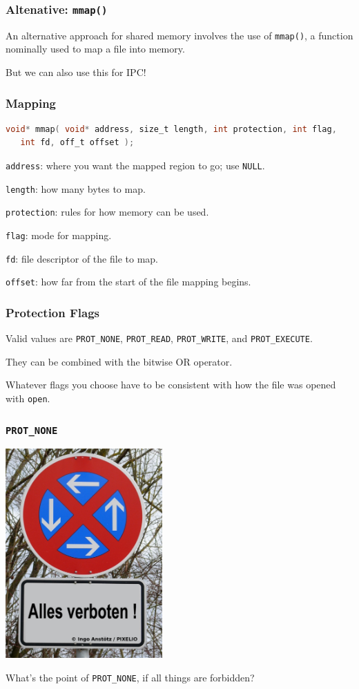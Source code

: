 \begin{frame}
\frametitle{Altenative: \texttt{mmap()}}

 An alternative approach for shared memory involves the use of \texttt{mmap()}, a function nominally used to map a file into memory. 

But we can also use this for IPC!

\end{frame}


\begin{frame}[fragile]
\frametitle{Mapping}
\begin{lstlisting}[language=C]
void* mmap( void* address, size_t length, int protection, int flag,
   int fd, off_t offset );
\end{lstlisting}

\texttt{address}: where you want the mapped region to go; use \texttt{NULL}.

\texttt{length}: how many bytes to map.

\texttt{protection}: rules for how memory can be used.

\texttt{flag}: mode for mapping.

\texttt{fd}: file descriptor of the file to map.

\texttt{offset}: how far from the start of the file mapping begins.

\end{frame}


\begin{frame}
\frametitle{Protection Flags}

Valid values are \texttt{PROT\_NONE}, \texttt{PROT\_READ}, \texttt{PROT\_WRITE}, and \texttt{PROT\_EXECUTE}.

They can be combined with the bitwise OR operator.

Whatever flags you choose have to be consistent with how the file was opened with \texttt{open}.

\end{frame}


\begin{frame}
\frametitle{\texttt{PROT\_NONE}}

\begin{center}
	\includegraphics[width=0.45\textwidth]{images/AllesVerboten.jpg}
\end{center}

What's the point of \texttt{PROT\_NONE}, if all things are forbidden?

\end{frame}


